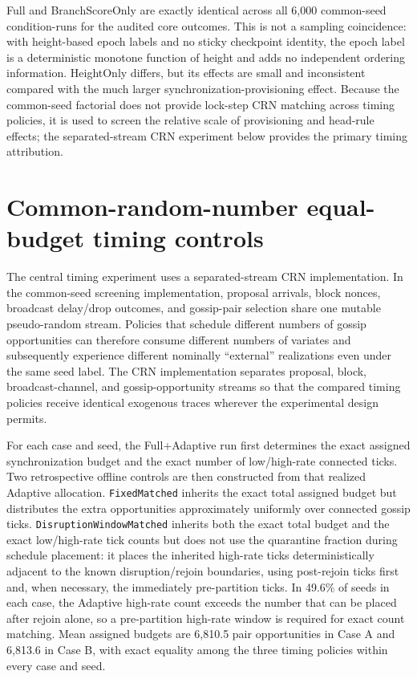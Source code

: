 \documentclass[11pt]{article}
\begin{document}
Full and BranchScoreOnly are exactly identical across all 6,000 common-seed condition-runs for the audited core outcomes. This is not a sampling coincidence: with height-based epoch labels and no sticky checkpoint identity, the epoch label is a deterministic monotone function of height and adds no independent ordering information. HeightOnly differs, but its effects are small and inconsistent compared with the much larger synchronization-provisioning effect. Because the common-seed factorial does not provide lock-step CRN matching across timing policies, it is used to screen the relative scale of provisioning and head-rule effects; the separated-stream CRN experiment below provides the primary timing attribution.

\section{Common-random-number equal-budget timing controls}
\label{sec:crn-equal-budget}
The central timing experiment uses a separated-stream CRN implementation. In the common-seed screening implementation, proposal arrivals, block nonces, broadcast delay/drop outcomes, and gossip-pair selection share one mutable pseudo-random stream. Policies that schedule different numbers of gossip opportunities can therefore consume different numbers of variates and subsequently experience different nominally ``external'' realizations even under the same seed label. The CRN implementation separates proposal, block, broadcast-channel, and gossip-opportunity streams so that the compared timing policies receive identical exogenous traces wherever the experimental design permits.

For each case and seed, the Full+Adaptive run first determines the exact assigned synchronization budget and the exact number of low/high-rate connected ticks. Two retrospective offline controls are then constructed from that realized Adaptive allocation. \texttt{FixedMatched} inherits the exact total assigned budget but distributes the extra opportunities approximately uniformly over connected gossip ticks. \texttt{DisruptionWindowMatched} inherits both the exact total budget and the exact low/high-rate tick counts but does not use the quarantine fraction during schedule placement: it places the inherited high-rate ticks deterministically adjacent to the known disruption/rejoin boundaries, using post-rejoin ticks first and, when necessary, the immediately pre-partition ticks. In 49.6\% of seeds in each case, the Adaptive high-rate count exceeds the number that can be placed after rejoin alone, so a pre-partition high-rate window is required for exact count matching. Mean assigned budgets are 6,810.5 pair opportunities in Case A and 6,813.6 in Case B, with exact equality among the three timing policies within every case and seed.
\end{document}
